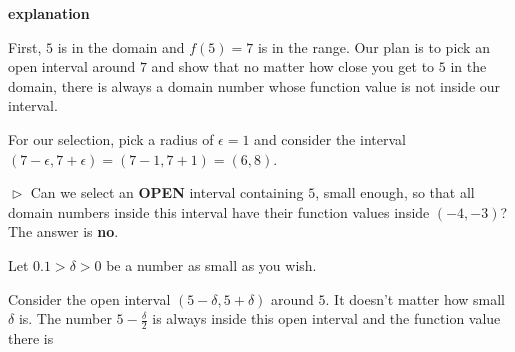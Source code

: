\documentclass{ximera}
\begin{document}
\begin{example}
\textbf{\textcolor{red!75!green}{explanation}} 


First, $5$ is in the domain and $f(5)=7$ is in the range.  Our plan is to pick an open interval around $7$ and show that no matter how close you get to $5$ in the domain, there is always a domain number whose function value is not inside our interval.


For our selection, pick a radius of $\epsilon = 1$ and consider the interval $(7-\epsilon , 7+\epsilon) = (7-1 , 7+1) = (6,8)$. \\


\begin{image}
\end{image}



$\vartriangleright$ Can we select an \textbf{\textcolor{red!70!black}{OPEN}} interval containing $5$, small enough, so that all domain numbers inside this interval have their function values inside $(-4,-3)$?  The answer is \textbf{no}.




Let $0.1 > \delta > 0$ be a number as small as you wish.

Consider the open interval $(5-\delta, 5+\delta)$ around $5$. It doesn't matter how small $\delta$ is.  The number $5 - \frac{\delta}{2}$ is always inside this open interval and the function value there is 


\end{example}
\end{document}
